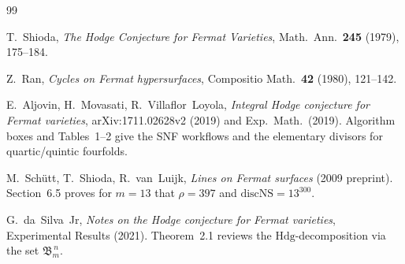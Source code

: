 \documentclass[11pt]{article}
\theoremstyle{definition}
\newcommand{\Hdg}{\mathrm{Hdg}}
\newcommand{\NS}{\mathrm{NS}}
\newcommand{\disc}{\mathrm{disc}}
\begin{document}
\begin{thebibliography}{99}

T.~Shioda, \emph{The Hodge Conjecture for Fermat Varieties}, Math.\ Ann.\ \textbf{245} (1979), 175--184.

Z.~Ran, \emph{Cycles on Fermat hypersurfaces}, Compositio Math.\ \textbf{42} (1980), 121--142.

E.~Aljovin, H.~Movasati, R.~Villaflor~Loyola, \emph{Integral Hodge conjecture for Fermat varieties}, arXiv:1711.02628v2 (2019) and Exp.\ Math.\ (2019). Algorithm boxes and Tables~1--2 give the SNF workflows and the elementary divisors for quartic/quintic fourfolds.

M.~Sch\"utt, T.~Shioda, R.~van~Luijk, \emph{Lines on Fermat surfaces} (2009 preprint). Section~6.5 proves for $m=13$ that $\rho=397$ and $\disc \NS=13^{300}$.

G.~da~Silva~Jr, \emph{Notes on the Hodge conjecture for Fermat varieties}, Experimental Results (2021). Theorem~2.1 reviews the $\Hdg$-decomposition via the set $\mathfrak B_m^{\,n}$.

\end{thebibliography}
\end{document}
